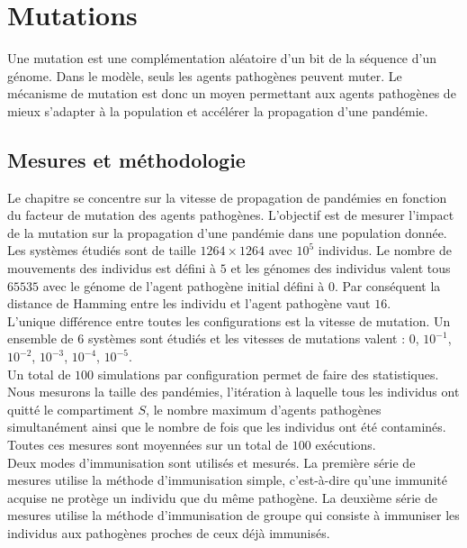 \chapter{Mutations} \label{ch:mutations}

Une mutation est une complémentation aléatoire d'un bit de la séquence d'un génome. Dans le modèle, seuls les agents pathogènes peuvent muter. Le mécanisme de mutation est donc un moyen permettant aux agents pathogènes de mieux s'adapter à la population et accélérer la propagation d'une pandémie.

\section{Mesures et méthodologie}

Le chapitre se concentre sur la vitesse de propagation de pandémies en fonction du facteur de mutation des agents pathogènes. L'objectif est de mesurer l'impact de la mutation sur la propagation d'une pandémie dans une population donnée. Les systèmes étudiés sont de taille $1264 \times 1264$ avec $10^5$ individus. Le nombre de mouvements des individus est défini à $5$ et les génomes des individus valent tous $65535$ avec le génome de l'agent pathogène initial défini à $0$. Par conséquent la distance de Hamming entre les individu et l'agent pathogène vaut $16$.\\

L'unique différence entre toutes les configurations est la vitesse de mutation. Un ensemble de $6$ systèmes sont étudiés et les vitesses de mutations valent : $0$, $10^{-1}$, $10^{-2}$, $10^{-3}$, $10^{-4}$, $10^{-5}$.\\

Un total de $100$ simulations par configuration permet de faire des statistiques. Nous mesurons la taille des pandémies, l'itération à laquelle tous les individus ont quitté le compartiment $S$, le nombre maximum d'agents pathogènes simultanément ainsi que le nombre de fois que les individus ont été contaminés. Toutes ces mesures sont moyennées sur un total de $100$ exécutions.\\

Deux modes d’immunisation sont utilisés et mesurés. La première série de mesures utilise la méthode d’immunisation simple, c’est-à-dire qu’une immunité acquise ne protège un individu que du même pathogène. La deuxième série de mesures utilise la méthode d’immunisation de groupe qui consiste à immuniser les individus aux pathogènes proches de ceux déjà immunisés.

